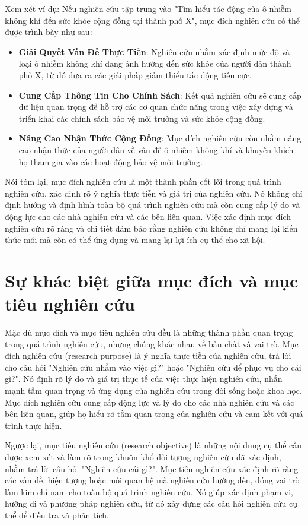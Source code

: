Xem xét ví dụ: Nếu nghiên cứu tập trung vào "Tìm hiểu tác động của ô nhiễm không khí đến sức khỏe cộng đồng tại thành phố X", mục đích nghiên cứu có thể được trình bày như sau:
\begin{itemize}
    \item \textbf{Giải Quyết Vấn Đề Thực Tiễn}: Nghiên cứu nhằm xác định mức độ và loại ô nhiễm không khí đang ảnh hưởng đến sức khỏe của người dân thành phố X, từ đó đưa ra các giải pháp giảm thiểu tác động tiêu cực.
    \item \textbf{Cung Cấp Thông Tin Cho Chính Sách}: Kết quả nghiên cứu sẽ cung cấp dữ liệu quan trọng để hỗ trợ các cơ quan chức năng trong việc xây dựng và triển khai các chính sách bảo vệ môi trường và sức khỏe cộng đồng.
    \item \textbf{Nâng Cao Nhận Thức Cộng Đồng}: Mục đích nghiên cứu còn nhằm nâng cao nhận thức của người dân về vấn đề ô nhiễm không khí và khuyến khích họ tham gia vào các hoạt động bảo vệ môi trường.
\end{itemize}

Nói tóm lại, mục đích nghiên cứu là một thành phần cốt lõi trong quá trình nghiên cứu, xác định rõ ý nghĩa thực tiễn và giá trị của nghiên cứu. Nó không chỉ định hướng và định hình toàn bộ quá trình nghiên cứu mà còn cung cấp lý do và động lực cho các nhà nghiên cứu và các bên liên quan. Việc xác định mục đích nghiên cứu rõ ràng và chi tiết đảm bảo rằng nghiên cứu không chỉ mang lại kiến thức mới mà còn có thể ứng dụng và mang lại lợi ích cụ thể cho xã hội.

\section{Sự khác biệt giữa mục đích và mục tiêu nghiên cứu}

Mặc dù mục đích và mục tiêu nghiên cứu đều là những thành phần quan trọng trong quá trình nghiên cứu, nhưng chúng khác nhau về bản chất và vai trò. Mục đích nghiên cứu (research purpose) là ý nghĩa thực tiễn của nghiên cứu, trả lời cho câu hỏi "Nghiên cứu nhằm vào việc gì?" hoặc "Nghiên cứu để phục vụ cho cái gì?". Nó định rõ lý do và giá trị thực tế của việc thực hiện nghiên cứu, nhấn mạnh tầm quan trọng và ứng dụng của nghiên cứu trong đời sống hoặc khoa học. Mục đích nghiên cứu cung cấp động lực và lý do cho các nhà nghiên cứu và các bên liên quan, giúp họ hiểu rõ tầm quan trọng của nghiên cứu và cam kết với quá trình thực hiện.

Ngược lại, mục tiêu nghiên cứu (research objective) là những nội dung cụ thể cần được xem xét và làm rõ trong khuôn khổ đối tượng nghiên cứu đã xác định, nhằm trả lời câu hỏi "Nghiên cứu cái gì?". Mục tiêu nghiên cứu xác định rõ ràng các vấn đề, hiện tượng hoặc mối quan hệ mà nghiên cứu hướng đến, đóng vai trò làm kim chỉ nam cho toàn bộ quá trình nghiên cứu. Nó giúp xác định phạm vi, hướng đi và phương pháp nghiên cứu, từ đó xây dựng các câu hỏi nghiên cứu cụ thể để điều tra và phân tích.

